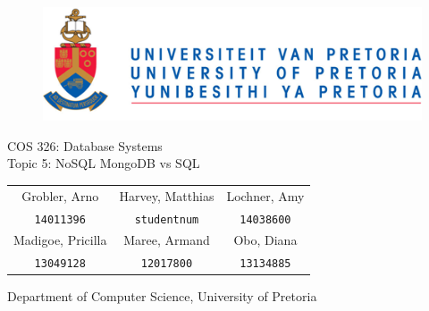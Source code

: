 \documentclass[hidelinks,english]{article}
\date{\today}
\begin{document}
	
	\begin{titlepage}
		\begin{figure}[!t]
			\includegraphics[width=\linewidth]{up_logo.png}
		\end{figure}
		\begin{center}
			\huge{COS 326: Database Systems}\\
			\huge{Topic 5: NoSQL MongoDB vs SQL}\\
			\vspace{10mm}
		\end{center}
		\begin{center}
			\begin{tabular}{ c c c }
				Grobler, Arno & Harvey, Matthias & Lochner, Amy  \\
				\texttt{14011396} & \texttt{studentnum} & \texttt{14038600} \\
				Madigoe, Pricilla & Maree, Armand & Obo, Diana \\
				\texttt{13049128} & \texttt{12017800} & \texttt{13134885} \\				
			\end{tabular}
		\end{center}
		\begin{center}
			Department of Computer Science, University of Pretoria
		\end{center}
	\end{titlepage}
	\newpage
	\tableofcontents
	\newpage
	

	
	
	
\end{document}
